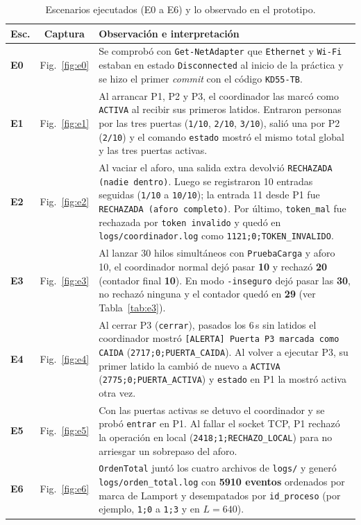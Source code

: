 \documentclass[10pt,a4paper]{article}
\begin{document}
\begin{table}[htbp]
\centering
\caption{Escenarios ejecutados (E0 a E6) y lo observado en el prototipo.}
\label{tab:escenarios}
\footnotesize
\setlength{\tabcolsep}{4pt}
\begin{tabularx}{\textwidth}{>{\bfseries}l c X}
\toprule
Esc. & Captura & Observación e interpretación \\
\midrule
E0 & Fig.~\ref{fig:e0} & Se comprobó con \texttt{Get-NetAdapter} que \texttt{Ethernet} y \texttt{Wi-Fi} estaban en estado \texttt{Disconnected} al inicio de la práctica y se hizo el primer \emph{commit} con el código \texttt{KD55-TB}. \\
E1 & Fig.~\ref{fig:e1} & Al arrancar P1, P2 y P3, el coordinador las marcó como \texttt{ACTIVA} al recibir sus primeros latidos. Entraron personas por las tres puertas (\texttt{1/10}, \texttt{2/10}, \texttt{3/10}), salió una por P2 (\texttt{2/10}) y el comando \texttt{estado} mostró el mismo total global y las tres puertas activas. \\
E2 & Fig.~\ref{fig:e2} & Al vaciar el aforo, una salida extra devolvió \texttt{RECHAZADA (nadie dentro)}. Luego se registraron 10 entradas seguidas (\texttt{1/10} a \texttt{10/10}); la entrada 11 desde P1 fue \texttt{RECHAZADA (aforo completo)}. Por último, \texttt{token\_mal} fue rechazada por \texttt{token invalido} y quedó en \texttt{logs/coordinador.log} como \texttt{1121;0;TOKEN\_INVALIDO}. \\
E3 & Fig.~\ref{fig:e3} & Al lanzar 30 hilos simultáneos con \texttt{PruebaCarga} y aforo 10, el coordinador normal dejó pasar \textbf{10} y rechazó \textbf{20} (contador final \textbf{10}). En modo \texttt{-inseguro} dejó pasar las \textbf{30}, no rechazó ninguna y el contador quedó en \textbf{29} (ver Tabla~\ref{tab:e3}). \\
E4 & Fig.~\ref{fig:e4} & Al cerrar P3 (\texttt{cerrar}), pasados los 6\,s sin latidos el coordinador mostró \texttt{[ALERTA] Puerta P3 marcada como CAIDA} (\texttt{2717;0;PUERTA\_CAIDA}). Al volver a ejecutar P3, su primer latido la cambió de nuevo a \texttt{ACTIVA} (\texttt{2775;0;PUERTA\_ACTIVA}) y \texttt{estado} en P1 la mostró activa otra vez. \\
E5 & Fig.~\ref{fig:e5} & Con las puertas activas se detuvo el coordinador y se probó \texttt{entrar} en P1. Al fallar el socket TCP, P1 rechazó la operación en local (\texttt{2418;1;RECHAZO\_LOCAL}) para no arriesgar un sobrepaso del aforo. \\
E6 & Fig.~\ref{fig:e6} & \texttt{OrdenTotal} juntó los cuatro archivos de \texttt{logs/} y generó \texttt{logs/orden\_total.log} con \textbf{5910 eventos} ordenados por marca de Lamport y desempatados por \texttt{id\_proceso} (por ejemplo, \texttt{1;0} a \texttt{1;3} y en $L=640$). \\
\bottomrule
\end{tabularx}
\end{table}
\end{document}
